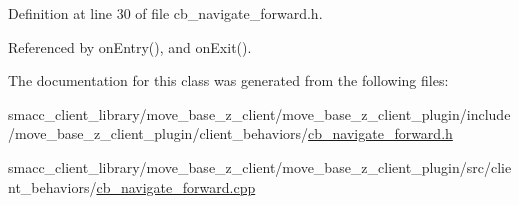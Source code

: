 Definition at line 30 of file cb\+\_\+navigate\+\_\+forward.\+h.



Referenced by on\+Entry(), and on\+Exit().



The documentation for this class was generated from the following files\+:\begin{DoxyCompactItemize}
\item 
smacc\+\_\+client\+\_\+library/move\+\_\+base\+\_\+z\+\_\+client/move\+\_\+base\+\_\+z\+\_\+client\+\_\+plugin/include/move\+\_\+base\+\_\+z\+\_\+client\+\_\+plugin/client\+\_\+behaviors/\hyperlink{cb__navigate__forward_8h}{cb\+\_\+navigate\+\_\+forward.\+h}\item 
smacc\+\_\+client\+\_\+library/move\+\_\+base\+\_\+z\+\_\+client/move\+\_\+base\+\_\+z\+\_\+client\+\_\+plugin/src/client\+\_\+behaviors/\hyperlink{cb__navigate__forward_8cpp}{cb\+\_\+navigate\+\_\+forward.\+cpp}\end{DoxyCompactItemize}
